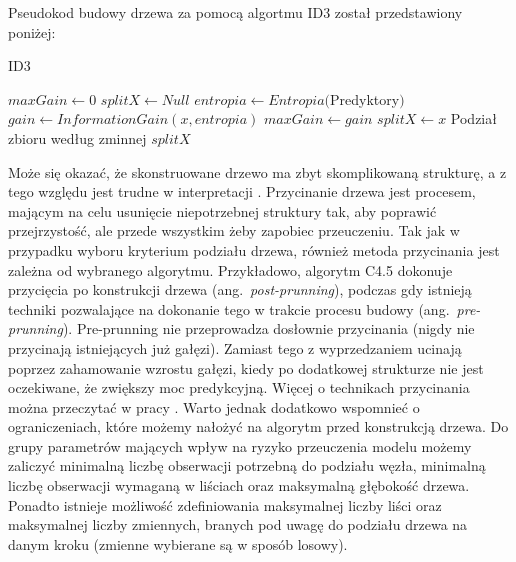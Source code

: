 \documentclass[12pt,a4paper,twoside,openany]{book}
\begin{document}
Pseudokod budowy drzewa za pomocą algortmu ID3 został przedstawiony poniżej:

\begin{algorithm}
\renewcommand\thealgorithm{}
\caption{ID3}
\begin{algorithmic} \label{schemat1}
\REPEAT
\STATE $maxGain \leftarrow 0$  
\STATE $splitX \leftarrow Null$ 
\STATE $entropia \leftarrow Entropia($Predyktory$)$
\STATE $gain \leftarrow InformationGain(x, entropia)$
\STATE $maxGain \leftarrow gain$
\STATE $splitX \leftarrow x$
\ENDIF
\ENDFOR
\STATE Podział zbioru według zminnej $splitX$
\end{algorithmic}
\addtocounter{algorithm}{-1}
\end{algorithm}

Może się okazać, że skonstruowane drzewo ma zbyt skomplikowaną strukturę, a z tego względu jest trudne w interpretacji \citep{mingers1989}. Przycinanie drzewa jest procesem, mającym na celu usunięcie niepotrzebnej struktury tak, aby poprawić przejrzystość, ale przede wszystkim żeby zapobiec przeuczeniu. Tak jak w przypadku wyboru kryterium podziału drzewa, również metoda przycinania jest zależna od wybranego algorytmu. Przykładowo, algorytm C4.5 dokonuje przycięcia po konstrukcji drzewa (ang.~\textit{post-prunning}), podczas gdy istnieją techniki pozwalające na dokonanie tego w trakcie procesu budowy (ang.~\textit{pre-prunning}). Pre-prunning nie przeprowadza dosłownie przycinania (nigdy nie przycinają istniejących już gałęzi). Zamiast tego z wyprzedzaniem ucinają poprzez zahamowanie wzrostu gałęzi, kiedy po dodatkowej strukturze nie jest oczekiwane, że zwiększy moc predykcyjną. Więcej o technikach przycinania można przeczytać w pracy \citet{frank2000}. Warto jednak dodatkowo wspomnieć o ograniczeniach, które możemy nałożyć na algorytm przed konstrukcją drzewa. Do grupy parametrów mających wpływ na ryzyko przeuczenia modelu możemy zaliczyć minimalną liczbę obserwacji potrzebną do podziału węzła, minimalną liczbę obserwacji wymaganą w liściach oraz maksymalną głębokość drzewa. Ponadto istnieje możliwość zdefiniowania maksymalnej liczby liści oraz maksymalnej liczby zmiennych, branych pod uwagę do podziału drzewa na danym kroku (zmienne wybierane są w sposób losowy). 
\end{document}
